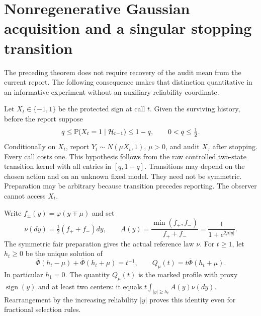 \section{Nonregenerative Gaussian acquisition and a singular stopping transition}
\label{sec:gaussian}
The preceding theorem does not require recovery of the audit mean from the current report. The following consequence makes that distinction quantitative in an informative experiment without an auxiliary reliability coordinate.

Let $X_t\in\{-1,1\}$ be the protected sign at call $t$. Given the surviving history, before the report suppose
\begin{equation}\label{eq:prior-floor}
 q\le \mathbb P(X_t=1\mid\mathcal H_{t-1})\le1-q,
 \qquad0<q\le\tfrac12.
\end{equation}
Conditionally on $X_t$, report $Y_t\sim N(\mu X_t,1)$, $\mu>0$, and audit $X_\tau$ after stopping. Every call costs one. This hypothesis follows from the raw controlled two-state transition kernel with all entries in $[q,1-q]$. Transitions may depend on the chosen action and on an unknown fixed model. They need not be symmetric. Preparation may be arbitrary because transition precedes reporting. The observer cannot access $X_t$.

Write $f_\pm(y)=\varphi(y\mp\mu)$ and set
\[
 \nu(dy)=\tfrac12(f_++f_-)dy,\qquad
 A(y)=\frac{\min(f_+,f_-)}{f_++f_-}
     =\frac1{1+e^{2\mu|y|}}.
\]
The symmetric fair preparation gives the actual reference law $\nu$. For $t\ge1$, let $h_t\ge0$ be the unique solution of
\begin{equation}\label{eq:two-sided-threshold}
 \overline\Phi(h_t-\mu)+\overline\Phi(h_t+\mu)=t^{-1},
 \qquad Q_\mu(t)=t\overline\Phi(h_t+\mu).
\end{equation}
In particular $h_1=0$. The quantity $Q_\mu(t)$ is the marked profile with proxy $\operatorname{sign}(y)$ and at least two centers: it equals
$t\int_{|y|\ge h_t}A(y)\nu(dy)$. Rearrangement by the increasing reliability $|y|$ proves this identity even for fractional selection rules.


